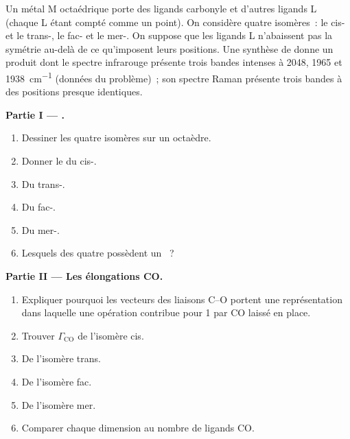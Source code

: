 \begin{problem}
\label{pb:b3:group-theory-applied:1}
Un métal M octaédrique porte des ligands carbonyle et d'autres ligands L
(chaque L étant compté comme un point). On considère quatre isomères~:
le cis- et le
trans-, le fac- et le mer-. On suppose que les
ligands L n'abaissent pas la symétrie au-delà de ce qu'imposent leurs
positions. Une synthèse de
 donne un produit dont le spectre infrarouge présente trois
bandes intenses à 2048, 1965 et \qty{1938}{cm^{-1}} (données du
problème)~; son spectre Raman présente trois bandes à des positions
presque identiques.

\medskip\noindent\textbf{Partie I --- .}
\begin{enumerate}
  \item Dessiner les quatre isomères sur un octaèdre.
  \item Donner le  du cis-.
  \item Du trans-.
  \item Du fac-.
  \item Du mer-.
  \item Lesquels des quatre possèdent un ~?
\end{enumerate}

\medskip\noindent\textbf{Partie II --- Les élongations CO.}
\begin{enumerate}[resume]
  \item Expliquer pourquoi les vecteurs des liaisons C--O portent une
        représentation dans laquelle une opération contribue pour 1 par
        CO laissé en place.
  \item Trouver $\Gamma_{\mathrm{CO}}$ de l'isomère cis.
  \item De l'isomère trans.
  \item De l'isomère fac.
  \item De l'isomère mer.
  \item Comparer chaque dimension au nombre de ligands CO.
\end{enumerate}


\end{problem}
